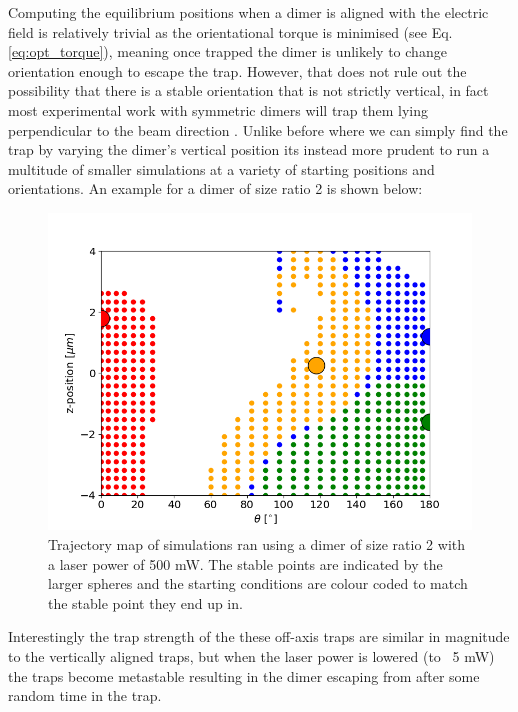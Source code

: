 Computing the equilibrium positions when a dimer is aligned with the electric field is relatively trivial as the orientational torque is minimised (see Eq.\ref{eq:opt_torque}), meaning once trapped the dimer is unlikely to change orientation enough to escape the trap. However, that does not rule out the possibility that there is a stable orientation that is not strictly vertical, in fact most experimental work with symmetric dimers will trap them lying perpendicular to the beam direction \cite{Ahn2018}. Unlike before where we can simply find the trap by varying the dimer's vertical position its instead more prudent to run a multitude of smaller simulations at a variety of starting positions and orientations. An example for a dimer of size ratio 2 is shown below:

\begin{figure}[h!]
	\centering
	\includegraphics[width=0.75\linewidth]{off_axis_trap.png}
	\caption{Trajectory map of simulations ran using a dimer of size ratio 2 with a laser power of 500 mW. The stable points are indicated by the larger spheres and the starting conditions are colour coded to match the stable point they end up in.}
\end{figure}

Interestingly the trap strength of the these off-axis traps are similar in magnitude to the vertically aligned traps, but when the laser power is lowered (to ~5 mW) the traps become metastable resulting in the dimer escaping from after some random time in the trap. 

